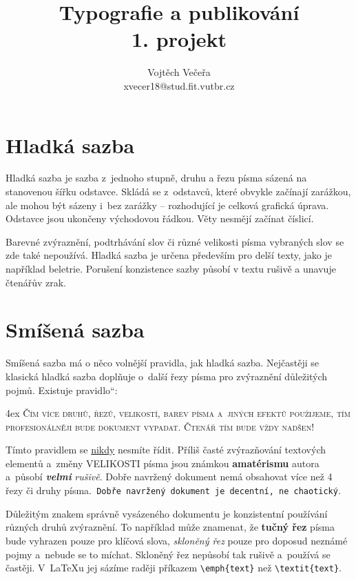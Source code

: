 \documentclass[11pt,a4paper,twocolumn]{article}
\providecommand{\myuv}[1]{\quotedblbase #1\textquotedblleft}
\begin{document}
\title{Typografie a publikování \\ 1. projekt}
\author{Vojtěch Večeřa \\ xvecer18@stud.fit.vutbr.cz}
\date{}
\maketitle
\section{Hladká sazba}

\noindent Hladká sazba je sazba z~jednoho stupně, druhu a řezu písma sázená na stanovenou šířku odstavce. Skládá se z~odstavců, které obvykle začínají zarážkou, ale mohou být sázeny i~bez zarážky -- rozhodující je celková grafická úprava. Odstavce jsou ukončeny východovou řádkou. Věty nesmějí začínat číslicí. 

\indent Barevné zvýraznění, podtrhávání slov či různé velikosti písma vybraných slov se zde také nepoužívá. Hladká sazba je určena především pro delší texty, jako je například beletrie. Porušení konzistence sazby působí v textu rušivě a unavuje čtenářův zrak. 

\section{Smíšená sazba}

\noindent Smíšená sazba má o něco volnější pravidla, jak hladká sazba. Nejčastěji se klasická hladká sazba doplňuje o~další řezy písma pro zvýraznění důležitých pojmů. Existuje \myuv{pravidlo}:

\bigskip
\begingroup
\leftskip4ex
\rightskip\leftskip
{\scshape\indent Čím více druhů, řezů, velikostí, barev písma a~jiných efektů po\-uži\-je\-me, tím profesionálněji bude dokument vypadat. Čtenář tím bude vždy nadšen!
}\par
\endgroup
\bigskip

\indent Tímto pravidlem se \underline{nikdy} nesmíte řídit. Příliš časté zvýrazňování textových elementů a~změny {\huge V}{\LARGE E}{\Large L}{\large I}{\normalsize  K}{\small O}{\footnotesize S}{\scriptsize T}{\tiny I} \normalsize písma \Large jsou \LARGE známkou \textbf{\Huge amatérismu} \normalsize autora a~působí \textbf{\itshape velmi} \textit{rušivě}. Dobře navržený dokument nemá obsahovat více než 4 řezy či druhy písma.\texttt{ Dobře navržený dokument je decentní, ne chaotický}.

\indent Důležitým znakem správně vysázeného dokumentu je konzistentní používání různých druhů zvýraznění. To například může znamenat, že \textbf{tučný řez} písma bude vyhrazen pouze pro klíčová slova, \textsl{skloněný řez} pouze pro doposud neznámé pojmy a~nebude se to míchat. Skloněný řez nepůsobí tak rušivě a~používá se častěji. V~\LaTeX u jej sázíme raději příkazem \verb|\emph{text}| než \verb|\textit{text}|.
\end{document}
